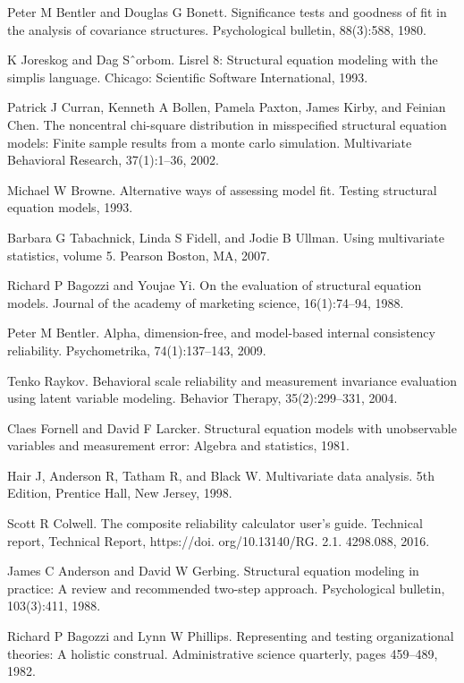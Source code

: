 \documentclass[letterpaper,12pt,titlepage,oneside,final,a4j,dvipdfmx]{book}
\begin{document}
\begin{thebibliography}{50}
  Peter M Bentler and Douglas G Bonett. Significance tests and goodness of fit in the analysis of covariance structures. Psychological bulletin, 88(3):588, 1980.

 K Joreskog and Dag Sˆorbom. Lisrel 8: Structural equation modeling with the simplis language. Chicago: Scientific Software International, 1993.

 Patrick J Curran, Kenneth A Bollen, Pamela Paxton, James Kirby, and Feinian Chen. The noncentral chi-square distribution in misspecified structural equation models: Finite sample results from a monte carlo simulation. Multivariate Behavioral Research, 37(1):1–36, 2002.

  Michael W Browne. Alternative ways of assessing model fit. Testing structural equation models, 1993.

 Barbara G Tabachnick, Linda S Fidell, and Jodie B Ullman. Using multivariate statistics, volume 5. Pearson Boston, MA, 2007.

  Richard P Bagozzi and Youjae Yi. On the evaluation of structural equation models. Journal of the academy of marketing science, 16(1):74–94, 1988.



 Peter M Bentler. Alpha, dimension-free, and model-based internal consistency reliability. Psychometrika, 74(1):137–143, 2009.

 Tenko Raykov. Behavioral scale reliability and measurement invariance evaluation using latent variable modeling. Behavior Therapy, 35(2):299–331, 2004.

  Claes Fornell and David F Larcker. Structural equation models with unobservable variables and measurement error: Algebra and statistics, 1981.

  Hair J, Anderson R, Tatham R, and Black W. Multivariate data analysis. 5th Edition, Prentice Hall, New Jersey, 1998.

 Scott R Colwell. The composite reliability calculator user's guide. Technical report, Technical Report, https://doi. org/10.13140/RG. 2.1. 4298.088, 2016.


 James C Anderson and David W Gerbing. Structural equation modeling in practice: A review and recommended two-step approach. Psychological bulletin, 103(3):411, 1988.


  Richard P Bagozzi and Lynn W Phillips. Representing and testing organizational theories: A holistic construal. Administrative science quarterly, pages 459–489, 1982.



\end{thebibliography}
\end{document}

